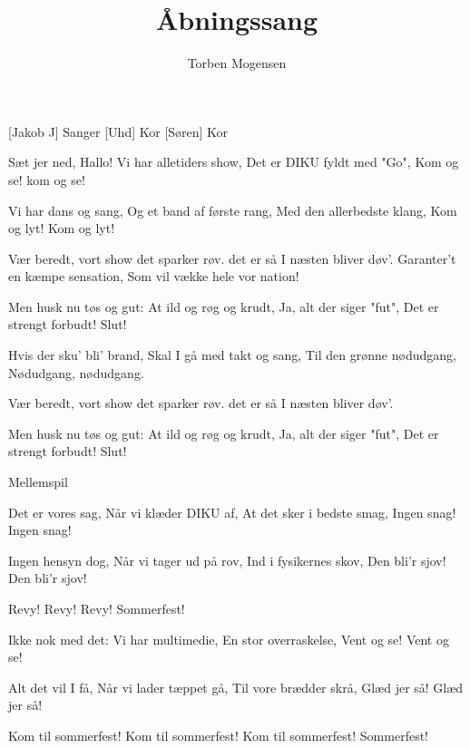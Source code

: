 \documentclass[a4paper]{article}
\title{Åbningssang}
\author{Torben Mogensen}
\begin{document}
\maketitle

\begin{roles}
[Jakob J] Sanger
[Uhd] Kor
[Søren] Kor
\end{roles}

\begin{props}
\end{props}

\begin{song}

Sæt jer ned,
 Hallo!
Vi har alletiders show,
Det er DIKU fyldt med "Go",
Kom og se! kom og se!

Vi har dans og sang,
Og et band af første rang,
Med den allerbedste klang,
Kom og lyt! Kom og lyt!

Vær beredt, vort show det sparker røv.  
det er så I næsten bliver døv'.
Garanter't en kæmpe sensation,
Som vil vække hele vor nation!

Men husk nu tøs og gut:
At ild og røg og krudt,
Ja, alt der siger "fut",
Det er strengt forbudt! Slut!

Hvis der sku' bli' brand,
Skal I gå med takt og sang,
Til den grønne nødudgang,
Nødudgang, nødudgang.

Vær beredt, vort show det sparker røv.
det er så I næsten bliver døv'.

Men husk nu tøs og gut:
At ild og røg og krudt,
Ja, alt der siger "fut",
Det er strengt forbudt! Slut!

\scene Mellemspil 

Det er vores sag,
Når vi klæder DIKU af,
At det sker i bedste smag,
Ingen snag! Ingen snag!

Ingen hensyn dog,
Når vi tager ud på rov,
Ind i fysikernes skov,
Den bli'r sjov! Den bli'r sjov!

Revy! Revy! Revy!
Sommerfest!

Ikke nok med det:
Vi har multimedie,
En stor overraskelse,
Vent og se! Vent og se!

Alt det vil I få,
Når vi lader tæppet gå,
Til vore brædder skrå,
Glæd jer så! Glæd jer så!

Kom til sommerfest!
Kom til sommerfest!
Kom til sommerfest!
Sommerfest!

\end{song}
\end{document}
